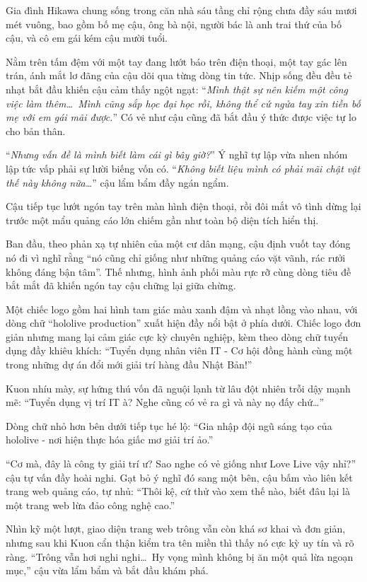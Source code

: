 \documentclass[../main.tex]{subfiles}
\begin{document}
Gia đình Hikawa chung sống trong căn nhà sáu tầng chỉ rộng chưa đầy sáu mươi mét vuông, bao gồm bố mẹ cậu, ông bà nội, người bác là anh trai thứ của bố cậu, và cô em gái kém cậu mười tuổi.

Nằm trên tấm đệm với một tay đang lướt báo trên điện thoại, một tay gác lên trán, ánh mắt lơ đãng của cậu dõi qua từng dòng tin tức. Nhịp sống đều đều tẻ nhạt bắt đầu khiến cậu cảm thấy ngột ngạt: ``\textit{Mình thật sự nên kiếm một công việc làm thêm\dots\ Mình cũng sắp học đại học rồi, không thể cứ ngửa tay xin tiền bố mẹ với em gái mãi được.}'' Có vẻ như cậu cũng đã bắt đầu ý thức được việc tự lo cho bản thân.

``\textit{Nhưng vấn đề là mình biết làm cái gì bây giờ?}'' Ý nghĩ tự lập vừa nhen nhóm lập tức vấp phải sự lười biếng vốn có. ``\textit{Không biết liệu mình có phải mãi chật vật thế này không nữa\dots}'' cậu lẩm bẩm đầy ngán ngẩm.

Cậu tiếp tục lướt ngón tay trên màn hình điện thoại, rồi đôi mắt vô tình dừng lại trước một mẩu quảng cáo lớn chiếm gần như toàn bộ diện tích hiển thị.

Ban đầu, theo phản xạ tự nhiên của một cư dân mạng, cậu định vuốt tay đóng nó đi vì nghĩ rằng ``nó cũng chỉ giống như những quảng cáo vặt vãnh, rác rưởi không đáng bận tâm''. Thế nhưng, hình ảnh phối màu rực rỡ cùng dòng tiêu đề bắt mắt đã khiến ngón tay cậu chững lại giữa chừng.

Một chiếc logo gồm hai hình tam giác màu xanh đậm và nhạt lồng vào nhau, với dòng chữ ``hololive production'' xuất hiện đầy nổi bật ở phía dưới. Chiếc logo đơn giản nhưng mang lại cảm giác cực kỳ chuyên nghiệp, kèm theo dòng chữ tuyển dụng đầy khiêu khích: ``Tuyển dụng nhân viên IT - Cơ hội đồng hành cùng một trong những dự án đổi mới giải trí hàng đầu Nhật Bản!''

Kuon nhíu mày, sự hứng thú vốn đã nguội lạnh từ lâu đột nhiên trỗi dậy mạnh mẽ: ``Tuyển dụng vị trí IT à? Nghe cũng có vẻ ra gì và này nọ đấy chứ\dots''

Dòng chữ nhỏ hơn bên dưới tiếp tục hé lộ: ``Gia nhập đội ngũ sáng tạo của hololive - nơi hiện thực hóa giấc mơ giải trí ảo.''

``Cơ mà, đây là công ty giải trí ư? Sao nghe có vẻ giống như Love Live vậy nhỉ?'' cậu tự vấn đầy hoài nghi. Gạt bỏ ý nghĩ đó sang một bên, cậu bấm vào liên kết trang web quảng cáo, tự nhủ: ``Thôi kệ, cứ thử vào xem thế nào, biết đâu lại là một trang web lừa đảo công nghệ cao.''

Nhìn kỹ một lượt, giao diện trang web trông vẫn còn khá sơ khai và đơn giản, nhưng sau khi Kuon cẩn thận kiểm tra tên miền thì thấy nó cực kỳ uy tín và rõ ràng. ``Trông vẫn hơi nghi nghi\dots\ Hy vọng mình không bị ăn một quả lừa ngoạn mục,'' cậu vừa lẩm bẩm và bắt đầu khám phá.
\end{document}
